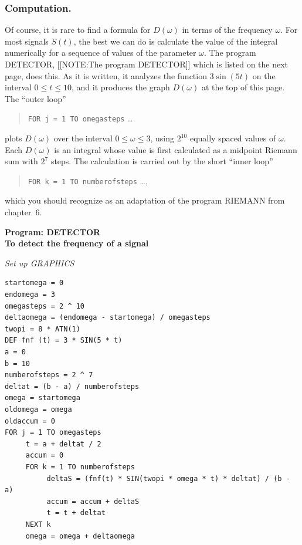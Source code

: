 \subsubsection{Computation.}
Of course, it is rare to find a formula for
$D(\omega)$ in terms of the frequency $\omega$.  For most signals
$S(t)$, the best we can do is calculate the value of the integral
numerically for a sequence of values of the parameter $\omega$.  The
program DETECTOR,
[[NOTE:The program DETECTOR]]	
which is listed on the next page, does this.  As it is written, it
analyzes the function $3\sin(5t)$ on the interval $0 \leq t \leq 10$,
and it produces the graph $D(\omega)$ at the top of this page.  The
``outer loop''
	\begin{quote}
	{\tt FOR j = 1 TO omegasteps} \quad \ldots {}
	\end{quote}
plots $D(\omega)$ over the interval $0 \leq \omega \leq 3$, using
$2^{10}$ equally spaced values of $\omega$.  Each $D(\omega)$ is an
integral whose value is first calculated as a midpoint Riemann sum
with $2^7$ steps.  The calculation is carried out by the short ``inner
loop''
	\begin{quote}
	{\tt FOR k = 1 TO numberofsteps} \quad \ldots {},
	\end{quote}
which you should recognize as an adaptation of the program RIEMANN
from chapter~6.


\begin{center}

{\bf Program: DETECTOR \\  
To detect the frequency of a signal}
\end{center}

\footnotesize
\hspace{-20pt}
\noindent
{\sl Set up GRAPHICS}

\begin{verbatim}
startomega = 0
endomega = 3
omegasteps = 2 ^ 10
deltaomega = (endomega - startomega) / omegasteps
twopi = 8 * ATN(1)
DEF fnf (t) = 3 * SIN(5 * t)
a = 0
b = 10
numberofsteps = 2 ^ 7
deltat = (b - a) / numberofsteps
omega = startomega
oldomega = omega
oldaccum = 0
FOR j = 1 TO omegasteps
     t = a + deltat / 2
     accum = 0
     FOR k = 1 TO numberofsteps
          deltaS = (fnf(t) * SIN(twopi * omega * t) * deltat) / (b - a)
          accum = accum + deltaS
          t = t + deltat
     NEXT k
     omega = omega + deltaomega
\end{verbatim}



